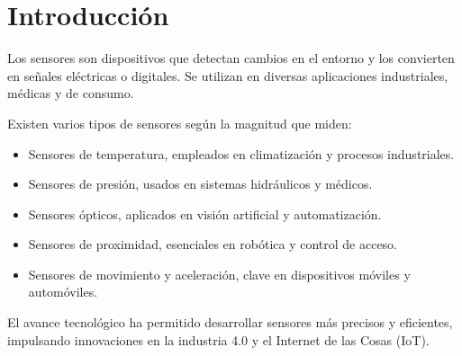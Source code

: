 \section{Introducción}
Los sensores son dispositivos que detectan cambios en el entorno y los convierten en señales eléctricas o digitales. Se utilizan en diversas aplicaciones industriales, médicas y de consumo.

Existen varios tipos de sensores según la magnitud que miden:

\begin{itemize}
    \item Sensores de temperatura, empleados en climatización y procesos industriales.
    \item Sensores de presión, usados en sistemas hidráulicos y médicos.
    \item Sensores ópticos, aplicados en visión artificial y automatización.
    \item Sensores de proximidad, esenciales en robótica y control de acceso.
    \item Sensores de movimiento y aceleración, clave en dispositivos móviles y automóviles.
\end{itemize}
El avance tecnológico ha permitido desarrollar sensores más precisos y eficientes, impulsando innovaciones en la industria 4.0 y el Internet de las Cosas (IoT).

